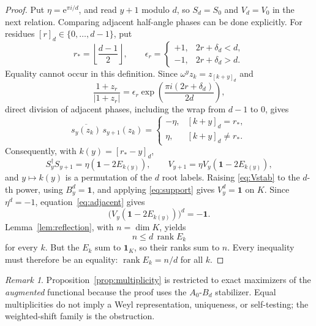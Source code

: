 \documentclass[11pt]{article}
\theoremstyle{remark}
\newtheorem{remark}[theorem]{Remark}
\newcommand{\Id}{\mathbf 1}
\newcommand{\e}{\mathrm e}
\begin{document}
\begin{proof}
Put \(\eta=\e^{\pi i/d}\), and read \(y+1\) modulo \(d\), so
\(S_d=S_0\) and \(V_d=V_0\) in the next relation.  Comparing adjacent
half-angle phases can be done explicitly.  For residues
\([r]_d\in\{0,\ldots,d-1\}\), put
\[
  r_*=\left\lfloor\frac{d-1}{2}\right\rfloor,\qquad
  \epsilon_r=
  \begin{cases}
    +1,&2r+\delta_d<d,\\
    -1,&2r+\delta_d>d.
  \end{cases}
\]
Equality cannot occur in this definition.  Since
\(\omega^yz_k=z_{[k+y]_d}\) and
\[
  \frac{1+z_r}{\lvert1+z_r\rvert}
  =
  \epsilon_r
  \exp\!\left(\frac{\pi i(2r+\delta_d)}{2d}\right),
\]
direct division of adjacent phases, including the wrap from \(d-1\) to \(0\),
gives
\[
  \overline{s_y(z_k)}\,s_{y+1}(z_k)
  =
  \begin{cases}
    -\eta,&[k+y]_d=r_*,\\
    \eta,&[k+y]_d\neq r_*.
  \end{cases}
\]
Consequently, with \(k(y)=[r_*-y]_d\),
\begin{equation}
  S_y^\dagger S_{y+1}
  =\eta(\Id-2E_{k(y)}),
  \qquad
  V_{y+1}=\eta V_y(\Id-2E_{k(y)}),
  \label{eq:adjacent}
\end{equation}
and \(y\mapsto k(y)\) is a permutation of the \(d\) root labels.
Raising \eqref{eq:Vstab} to the \(d\)-th power, using \(B_y^d=\Id\), and
applying \eqref{eq:support} gives \(V_y^d=\Id\) on \(K\).
Since \(\eta^d=-1\), equation~\eqref{eq:adjacent} gives
\[
  \bigl(V_y(\Id-2E_{k(y)})\bigr)^d=-\Id.
\]
Lemma~\ref{lem:reflection}, with \(n=\dim K\), yields
\[
  n\leq d\,\operatorname{rank}E_k
\]
for every \(k\).  But the \(E_k\) sum to \(\Id_K\), so their ranks sum to
\(n\).  Every inequality must therefore be an equality:
\(\operatorname{rank}E_k=n/d\) for all \(k\).
\end{proof}

\begin{remark}
Proposition~\ref{prop:multiplicity} is restricted to exact maximizers of the
\emph{augmented} functional because the proof uses the \(A_0\)-\(B_d\)
stabilizer.  Equal multiplicities do not imply a Weyl representation,
uniqueness, or self-testing; the weighted-shift family is the obstruction.
\end{remark}
\end{document}
